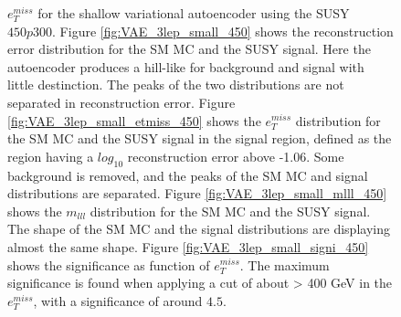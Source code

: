 \begin{figure}[!htb]
{    $e_T^{miss}$ for the shallow variational autoencoder using the SUSY $450p300$. 
    Figure \ref{fig:VAE_3lep_small_450} shows the reconstruction error 
    distribution for the SM MC and the SUSY signal. Here the autoencoder produces a hill-like for background and 
    signal with little destinction. The peaks of the two distributions are not separated in reconstruction error. Figure \ref{fig:VAE_3lep_small_etmiss_450} 
    shows the $e_T^{miss}$ distribution for the SM MC and the SUSY signal in the signal region, defined as the region having a $log_{10}$ 
    reconstruction error above -1.06. Some background is removed, and the peaks of the SM MC and signal 
    distributions are separated. Figure \ref{fig:VAE_3lep_small_mlll_450} shows the $m_{lll}$ distribution for the SM MC and the SUSY signal. 
    The shape of the SM MC and the signal distributions are displaying almost the same shape. Figure \ref{fig:VAE_3lep_small_signi_450} shows the significance as 
    function of $e_T^{miss}$. The maximum significance is found when applying a cut of about > 400 GeV in the $e_T^{miss}$, with a significance of around $4.5$.}
    \label{fig:VAE_3lep_small_rec_sig_signi_450}
\end{figure}









